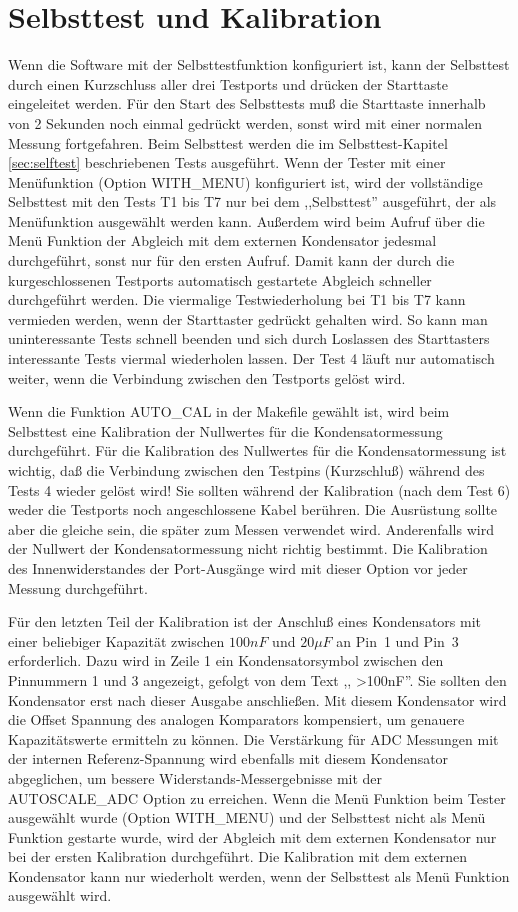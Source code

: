 \section{Selbsttest und Kalibration}

Wenn die Software mit der Selbsttestfunktion konfiguriert ist, kann der Selbsttest durch einen Kurzschluss aller drei
Testports und drücken der Starttaste eingeleitet werden.
Für den Start des Selbsttests muß die Starttaste innerhalb von 2 Sekunden noch einmal gedrückt werden,
sonst wird mit einer normalen Messung fortgefahren.
Beim Selbsttest werden die im Selbsttest-Kapitel \ref{sec:selftest} beschriebenen Tests ausgeführt.
Wenn der Tester mit einer Menüfunktion (Option WITH\_MENU) konfiguriert ist, 
wird der vollständige Selbsttest mit den Tests T1 bis T7 nur bei dem ,,Selbsttest'' ausgeführt, 
der als Menüfunktion ausgewählt werden kann.
Außerdem wird beim Aufruf über die Menü Funktion der Abgleich mit dem externen Kondensator jedesmal durchgeführt,
sonst nur für den ersten Aufruf.
Damit kann der durch die kurgeschlossenen Testports automatisch gestartete Abgleich schneller durchgeführt werden. 
Die viermalige Testwiederholung bei T1 bis T7 kann vermieden werden, wenn der Starttaster gedrückt gehalten wird.
So kann man uninteressante Tests schnell beenden und
sich durch Loslassen des Starttasters interessante Tests viermal wiederholen lassen.
Der Test 4 läuft nur automatisch weiter, wenn die Verbindung zwischen den Testports gelöst wird.

Wenn die Funktion AUTO\_CAL in der Makefile gewählt ist, wird beim Selbsttest
eine Kalibration der Nullwertes für die Kondensatormessung durchgeführt.
Für die Kalibration des Nullwertes für die Kondensatormessung ist wichtig, 
daß die Verbindung zwischen den Testpins (Kurzschluß) während des Tests 4 wieder gelöst wird!
Sie sollten während der Kalibration (nach dem Test 6) weder die Testports noch angeschlossene Kabel berühren.
Die Ausrüstung sollte aber die gleiche sein, die später zum Messen verwendet wird.
Anderenfalls wird der Nullwert der Kondensatormessung nicht richtig bestimmt.
Die Kalibration des Innenwiderstandes der Port-Ausgänge wird mit dieser Option vor jeder
Messung durchgeführt.

Für den letzten Teil der Kalibration ist der Anschluß eines Kondensators 
mit einer beliebiger Kapazität zwischen \(100 nF\) und \(20 \mu F\) an Pin~1 und Pin~3 erforderlich.
Dazu wird in Zeile 1 ein Kondensatorsymbol zwischen den Pinnummern 1 und 3 angezeigt, gefolgt von dem Text ,, \textgreater100nF''.
Sie sollten den Kondensator erst nach dieser Ausgabe anschließen.
Mit diesem Kondensator wird die Offset Spannung des analogen Komparators kompensiert,
um genauere Kapazitätswerte ermitteln zu können.
Die Verstärkung für ADC Messungen mit der internen Referenz-Spannung wird ebenfalls mit diesem Kondensator abgeglichen, um
bessere Widerstands-Messergebnisse mit der AUTOSCALE\_ADC Option zu erreichen.
Wenn die Menü Funktion beim Tester ausgewählt wurde (Option WITH\_MENU) und der Selbsttest
nicht als Menü Funktion gestarte wurde, wird der Abgleich mit dem externen Kondensator nur bei
der ersten Kalibration durchgeführt.
Die Kalibration mit dem externen Kondensator kann nur wiederholt werden, wenn der Selbsttest
als Menü Funktion ausgewählt wird.

